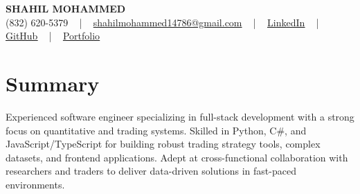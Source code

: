 \documentclass[letterpaper,10pt]{article}
\begin{document}
\begin{center}
    {\fontsize{14pt}{12pt}\selectfont \textbf{\MakeUppercase{Shahil Mohammed}}}\\ \vspace{2pt}
    \fontsize{10pt}{12pt}\selectfont (832) 620-5379 ~ | ~ \href{mailto:shahilmohammed14786@gmail.com}{shahilmohammed14786@gmail.com} ~ | ~  
    \href{https://www.linkedin.com/in/shahil-mohammed-9652931a1/}{\color{blue}\underline{LinkedIn}}  ~ | ~ 
    \href{https://github.com/freakbeast14}{\color{blue}\underline{GitHub}} ~ | ~ 
    \href{https://shahil-mohammed.netlify.app/}{\color{blue}\underline{Portfolio}}
    \vspace{-8pt}
\end{center}

\section{Summary}
\vspace{-2pt}\fontsize{8pt}{9pt}\selectfont
Experienced software engineer specializing in full-stack development with a strong focus on quantitative and trading systems. Skilled in Python, C\#, and JavaScript/TypeScript for building robust trading strategy tools, complex datasets, and frontend applications. Adept at cross-functional collaboration with researchers and traders to deliver data-driven solutions in fast-paced environments.
 \vspace{-5pt}
 
\vspace{-2pt}
\end{document}
